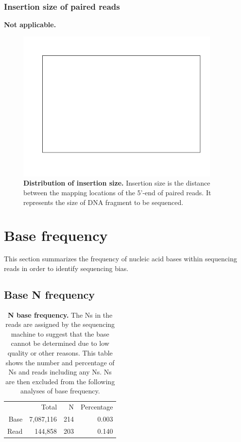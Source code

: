 \documentclass{article}
\begin{document}
\subsubsection{Insertion size of paired reads}
\textbf{Not applicable.}


\begin{center}
\begin{figure}
\includegraphics[width=4in, height=3in]{bamchop-pair-insert}
\caption{\textbf{Distribution of insertion size. }Insertion size is the distance between the mapping locations of the 5'-end of paired reads. It represents the size of DNA fragment to be sequenced.}
\end{figure}
\end{center}

\pagebreak
\section{Base frequency}
This section summarizes the frequency of nucleic acid bases within sequencing reads in order to identify sequencing bias. 

\subsection{Base N frequency}
\begin{table}
\begin{tabular}{|r|r|r|r|}
  \hline
 & Total & N & Percentage \\ 
  \rowcolor[gray]{0.9} \hline
Base & 7,087,116 & 214 & 0.003 \\ 
  Read &   144,858 & 203 & 0.140 \\ 
   \hline
\end{tabular}\caption{\textbf{N base frequency.} The Ns in the reads are assigned by the sequencing machine to suggest that the base cannot be determined due to low quality or other reasons. This table shows the number and percentage of Ns and reads including any Ns. Ns are then excluded from the following analyses of base frequency. }
\end{table}
\end{document}
